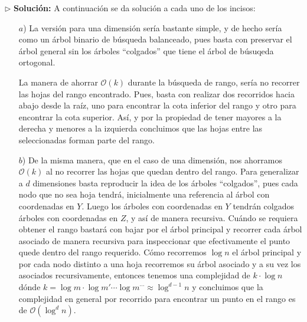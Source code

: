 $\rhd$ \textbf{Solución:} A continuación se da solución a cada uno de los incisos:
\begin{enumerate}
\item[$a$)] La versión para una dimensión sería bastante simple, y de hecho sería
  como un árbol binario de búsqueda balanceado, pues basta con preservar el árbol
  general sin los árboles ``colgados'' que tiene el árbol de búsuqeda ortogonal.
  \newline
  
  La manera de ahorrar $\mathcal{O}(k)$ durante la búsqueda de rango, sería no recorrer las
  hojas del rango encontrado. Pues, basta con realizar dos recorridos hacia abajo desde la
  raíz, uno para encontrar la cota inferior del rango y otro para encontrar la cota superior.
  Así, y por la propiedad de tener mayores a la derecha y menores a la izquierda concluimos
  que las hojas entre las seleccionadas forman parte del rango.
\item[$b$)] De la misma manera, que en el caso de una dimensión, nos ahorramos $\mathcal{O}(k)$
  al no recorrer las hojas que quedan dentro del rango. Para generalizar a $d$ dimensiones basta
  reproducir la idea de los árboles ``colgados'', pues cada nodo que no sea hoja tendrá, inicialmente
  una referencia al árbol con coordenadas en $Y$. Luego los árboles con coordenadas en $Y$ tendrán
  colgados árboles con coordenadas en $Z$, y así de manera recursiva. Cuándo se requiera obtener
  el rango bastará con bajar por el árbol principal y recorrer cada árbol asociado de manera
  recursiva para inspeccionar que efectivamente el punto quede dentro del rango requerido.
  Cómo recorremos $\log n$ el árbol principal y por cada nodo distinto a una hoja recorremos
  su árbol asociado y a su vez los asociados recursivamente, entonces tenemos una complejidad
  de $k \cdot \log n$ dónde $k = \log m \cdot \log m' \dotsm \log m^{\dotsm} \approx \log^{d - 1} n$
  y concluimos que la complejidad en general por recorrido para encontrar un punto en el rango
  es de $\mathcal{O}(\log^d n)$.\newline
  

\end{enumerate}
